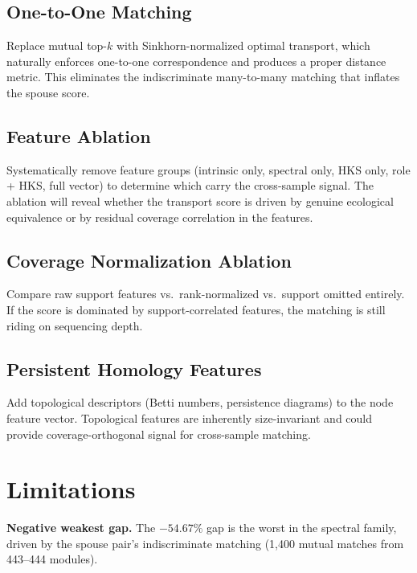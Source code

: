 \documentclass{../yalumba}
\begin{document}
\subsection{One-to-One Matching}

Replace mutual top-$k$ with Sinkhorn-normalized optimal transport, which
naturally enforces one-to-one correspondence and produces a proper distance
metric.  This eliminates the indiscriminate many-to-many matching that
inflates the spouse score.

\subsection{Feature Ablation}

Systematically remove feature groups (intrinsic only, spectral only, HKS only,
role + HKS, full vector) to determine which carry the cross-sample signal.
The ablation will reveal whether the transport score is driven by genuine
ecological equivalence or by residual coverage correlation in the features.

\subsection{Coverage Normalization Ablation}

Compare raw support features vs.\ rank-normalized vs.\ support omitted
entirely.  If the score is dominated by support-correlated features, the
matching is still riding on sequencing depth.

\subsection{Persistent Homology Features}

Add topological descriptors (Betti numbers, persistence diagrams) to the node
feature vector.  Topological features are inherently size-invariant and could
provide coverage-orthogonal signal for cross-sample matching.


\section{Limitations}
\label{sec:limitations}

\begin{limitation}
\textbf{Negative weakest gap.}  The $-54.67\%$ gap is the worst in the
spectral family, driven by the spouse pair's indiscriminate matching
(1{,}400 mutual matches from 443--444 modules).
\end{limitation}
\end{document}
